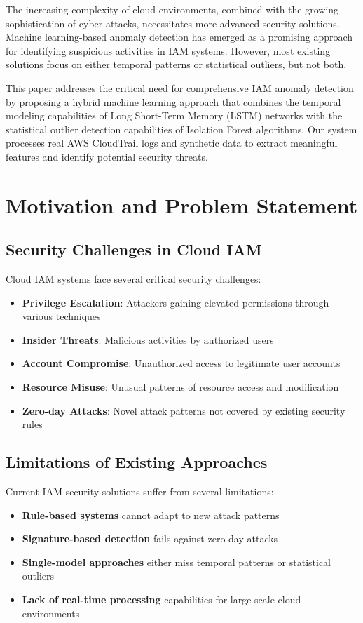 \documentclass[conference]{IEEEtran}
\begin{document}
The increasing complexity of cloud environments, combined with the growing sophistication of cyber attacks, necessitates more advanced security solutions. Machine learning-based anomaly detection has emerged as a promising approach for identifying suspicious activities in IAM systems. However, most existing solutions focus on either temporal patterns or statistical outliers, but not both.

This paper addresses the critical need for comprehensive IAM anomaly detection by proposing a hybrid machine learning approach that combines the temporal modeling capabilities of Long Short-Term Memory (LSTM) networks with the statistical outlier detection capabilities of Isolation Forest algorithms. Our system processes real AWS CloudTrail logs and synthetic data to extract meaningful features and identify potential security threats.

\section{Motivation and Problem Statement}
\subsection{Security Challenges in Cloud IAM}
Cloud IAM systems face several critical security challenges:

\begin{itemize}
    \item \textbf{Privilege Escalation}: Attackers gaining elevated permissions through various techniques
    \item \textbf{Insider Threats}: Malicious activities by authorized users
    \item \textbf{Account Compromise}: Unauthorized access to legitimate user accounts
    \item \textbf{Resource Misuse}: Unusual patterns of resource access and modification
    \item \textbf{Zero-day Attacks}: Novel attack patterns not covered by existing security rules
\end{itemize}

\subsection{Limitations of Existing Approaches}
Current IAM security solutions suffer from several limitations:

\begin{itemize}
    \item \textbf{Rule-based systems} cannot adapt to new attack patterns
    \item \textbf{Signature-based detection} fails against zero-day attacks
    \item \textbf{Single-model approaches} either miss temporal patterns or statistical outliers
    \item \textbf{Lack of real-time processing} capabilities for large-scale cloud environments
\end{itemize}
\end{document}
